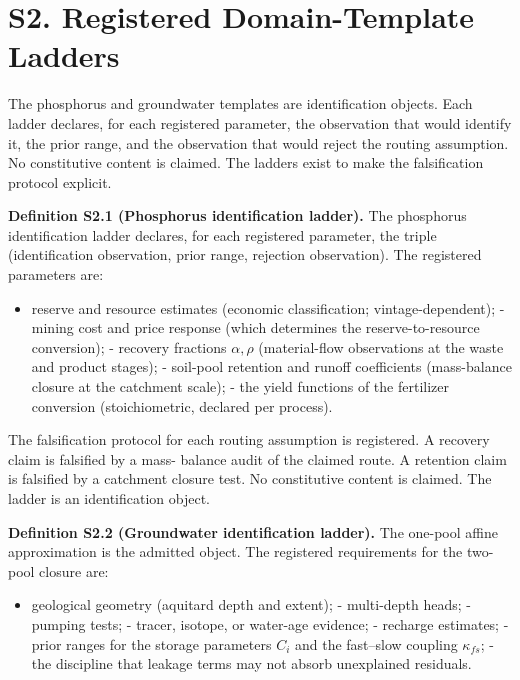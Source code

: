 \documentclass[11pt]{article}
\begin{document}
\vspace{0.8em}

\section*{S2. Registered Domain-Template Ladders}\label{s2-registered-domain-template-ladders}

The phosphorus and groundwater templates are identification objects. Each ladder declares, for each registered parameter, the observation that would identify it, the prior range, and the observation that would reject the routing assumption. No constitutive content is claimed. The ladders exist to make the falsification protocol explicit.

\textbf{Definition S2.1 (Phosphorus identification ladder).} The phosphorus identification ladder declares, for each registered parameter, the triple (identification observation, prior range, rejection observation). The registered parameters are:

\begin{itemize}\setlength{\itemsep}{2pt}
\item reserve and resource estimates (economic classification; vintage-dependent); - mining cost and price response (which determines the reserve-to-resource conversion); - recovery fractions \(\alpha, \rho\) (material-flow observations at the waste and product stages); - soil-pool retention and runoff coefficients (mass-balance closure at the catchment scale); - the yield functions of the fertilizer conversion (stoichiometric, declared per process).
\end{itemize}

The falsification protocol for each routing assumption is registered. A recovery claim is falsified by a mass- balance audit of the claimed route. A retention claim is falsified by a catchment closure test. No constitutive content is claimed. The ladder is an identification object.

\textbf{Definition S2.2 (Groundwater identification ladder).} The one-pool affine approximation is the admitted object. The registered requirements for the two-pool closure are:

\begin{itemize}\setlength{\itemsep}{2pt}
\item geological geometry (aquitard depth and extent); - multi-depth heads; - pumping tests; - tracer, isotope, or water-age evidence; - recharge estimates; - prior ranges for the storage parameters \(C_i\) and the fast--slow coupling \(\kappa_{fs}\); - the discipline that leakage terms may not absorb unexplained residuals.
\end{itemize}
\end{document}
